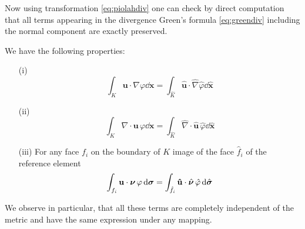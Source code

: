  Now using  transformation  \eqref{eq:piolahdiv} one can check by direct computation that all terms appearing in the divergence Green's formula \eqref{eq:greendiv} including the normal component are exactly preserved.
\begin{proposition}
We have the following properties:
\begin{itemize}
\item[(i)]
\begin{equation}\label{eq:greendivtransfgrad }
\int_K  \mathbf{u}\cdot \nabla\varphi \dd \mathbf{x} = \int_{\hat{K}}  \hat{\mathbf{u}}\cdot \hat{\nabla}\hat{\varphi}
 \dd \hat{\mathbf{x}}
\end{equation}
\item[(ii)]
\begin{equation}\label{eq:greendivtransf }
\int_K \nabla\cdot \mathbf{u} \,\varphi \dd \mathbf{x} = \int_{\hat{K}}  \hat{\nabla}\cdot\hat{\mathbf{u}}
\,\hat{\varphi} \dd \hat{\mathbf{x}}
\end{equation}
\item[(iii)] For any face $f_i$ on the boundary of $K$ image of the face $\hat{f}_i$ of the reference element
\begin{equation}\label{eq:greendivtransfb}\int_{f_i} \mathbf{u}\cdot \boldsymbol{\nu} \,\varphi \,{\rm d} \boldsymbol{\sigma} =
\int_{ \hat{f}_i} \mathbf{\hat{u}}\cdot \hat{\boldsymbol{\nu}} \, \hat{\varphi} \,{\rm d} \hat{\boldsymbol{\sigma}}
\end{equation}
\end{itemize}
\end{proposition}
We observe in particular, that all these terms are completely independent of the metric and have the same expression under any mapping. 

